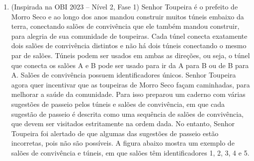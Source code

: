 \begin{enumerate}[label=\textbf{Q\arabic*.}]
    \item (Inspirada na OBI 2023 – Nível 2, Fase 1) Senhor Toupeira é o prefeito de Morro Seco e ao longo dos anos mandou construir muitos túneis embaixo da terra, conectando salões de convivência que ele também mandou construir, para alegria de sua comunidade de toupeiras. Cada túnel conecta exatamente dois salões de convivência distintos e não há dois túneis conectando o mesmo par de salões. Túneis podem ser usados em ambas as direções, ou seja, o túnel que conecta os salões A e B pode ser usado para ir da A para B ou de B para A. Salões de convivência possuem identificadores únicos. Senhor Toupeira agora quer incentivar que as toupeiras de Morro Seco façam caminhadas, para melhorar a saúde da comunidade. Para isso preparou um caderno com várias sugestões de passeio pelos túneis e salões de convivência, em que cada sugestão de passeio é descrita como uma sequência de salões de convivência, que devem ser visitados estritamente na ordem dada. No entanto, Senhor Toupeira foi alertado de que algumas das sugestões de passeio estão incorretas, pois não são possíveis. A figura abaixo mostra um exemplo de salões de convivência e túneis, em que salões têm identificadores 1, 2, 3, 4 e 5.

    \begin{center}
    \end{center}


\end{enumerate}
